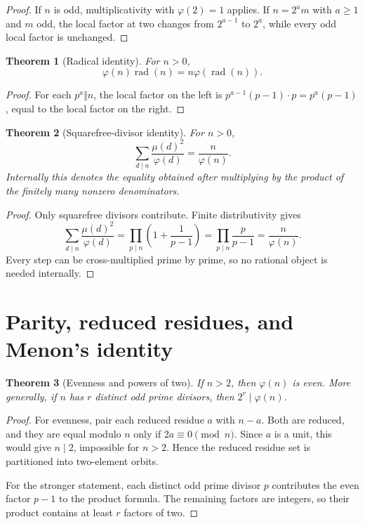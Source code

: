 \documentclass[11pt]{article}
\newtheorem{theorem}{Theorem}[section]
\theoremstyle{definition}
\newcommand{\rad}{\operatorname{rad}}
\begin{document}
\begin{proof}
If \(n\) is odd, multiplicativity with \(\varphi(2)=1\) applies.  If
\(n=2^a m\) with \(a\ge1\) and \(m\) odd, the local factor at two changes
from \(2^{a-1}\) to \(2^a\), while every odd local factor is unchanged.
\end{proof}

\begin{theorem}[Radical identity]\label{thm:phi-rad}
For \(n>0\),
\[
 \boxed{\varphi(n)\rad(n)=n\varphi(\rad(n)).}
\]
\end{theorem}

\begin{proof}
For each \(p^a\Vert n\), the local factor on the left is
\(p^{a-1}(p-1)\cdot p=p^a(p-1)\), equal to the local factor on the right.
\end{proof}

\begin{theorem}[Squarefree-divisor identity]\label{thm:squarefree-divisor}
For \(n>0\),
\[
 \boxed{\displaystyle
 \sum_{d\mid n}\frac{\mu(d)^2}{\varphi(d)}=\frac n{\varphi(n)}.}
\]
Internally this denotes the equality obtained after multiplying by the product
of the finitely many nonzero denominators.
\end{theorem}

\begin{proof}
Only squarefree divisors contribute.  Finite distributivity gives
\[
 \sum_{d\mid n}\frac{\mu(d)^2}{\varphi(d)}
 =\prod_{p\mid n}\left(1+\frac1{p-1}\right)
 =\prod_{p\mid n}\frac p{p-1}
 =\frac n{\varphi(n)}.
\]
Every step can be cross-multiplied prime by prime, so no rational object is
needed internally.
\end{proof}

\section{Parity, reduced residues, and Menon's identity}

\begin{theorem}[Evenness and powers of two]\label{thm:phi-even}
If \(n>2\), then \(\varphi(n)\) is even.  More generally, if \(n\) has
\(r\) distinct odd prime divisors, then \(2^r\mid\varphi(n)\).
\end{theorem}

\begin{proof}
For evenness, pair each reduced residue \(a\) with \(n-a\).  Both are reduced,
and they are equal modulo \(n\) only if \(2a\equiv0\pmod n\).  Since \(a\)
is a unit, this would give \(n\mid2\), impossible for \(n>2\).  Hence the
reduced residue set is partitioned into two-element orbits.

For the stronger statement, each distinct odd prime divisor \(p\) contributes
the even factor \(p-1\) to the product formula.  The remaining factors are
integers, so their product contains at least \(r\) factors of two.
\end{proof}
\end{document}
